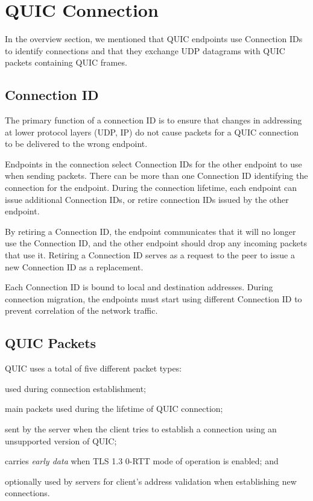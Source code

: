 \section{QUIC Connection}

In the overview section, we mentioned that QUIC endpoints use Connection IDs to identify connections
and that they exchange UDP datagrams with QUIC packets containing QUIC frames.

\subsection{Connection ID}

The primary function of a connection ID is to ensure that changes in addressing at lower protocol
layers (UDP, IP) do not cause packets for a QUIC connection to be delivered to the wrong endpoint.

Endpoints in the connection select Connection IDs for the other endpoint to use when sending
packets. There can be more than one Connection ID identifying the connection for the endpoint.
During the connection lifetime, each endpoint can issue additional Connection IDs, or retire
connection IDs issued by the other endpoint.

By retiring a Connection ID, the endpoint communicates that it will no longer use the Connection ID,
and the other endpoint should drop any incoming packets that use it. Retiring a Connection ID serves
as a request to the peer to issue a new Connection ID as a replacement.

Each Connection ID is bound to local and destination addresses. During connection migration, the
endpoints must start using different Connection ID to prevent correlation of the network traffic.

\subsection{QUIC Packets}

QUIC uses a total of five different packet types:

\begin{enumerate}

   used during connection establishment;

   main packets used during the lifetime of QUIC connection;

   sent by the server when the client tries to establish a connection
  using an unsupported version of QUIC\@;

   carries \textit{early data} when TLS 1.3 0-RTT mode of operation is enabled; and

   optionally used by servers for client's address validation when establishing new
  connections.

\end{enumerate}


